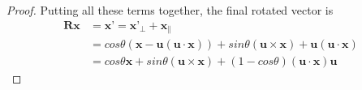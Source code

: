 \documentclass[letterpaper, 11pt]{article}
\begin{document}
\begin{proof}
    Putting all these terms together, the final rotated vector is
    \begin{align}
        \textbf{R}\textbf{x} & = \textbf{x'} = \textbf{x'}_{\perp} + \textbf{x}_{\parallel} \nonumber \\
                             & = cos\theta (\textbf{x} - \textbf{u}(\textbf{u} \cdot \textbf{x})) +
        sin\theta (\textbf{u} \times  \textbf{x}) +
        \textbf{u}(\textbf{u} \cdot \textbf{x})\nonumber                                              \\
                             & = cos\theta\textbf{x} + sin\theta (\textbf{u} \times  \textbf{x}) +
        (1-cos\theta)(\textbf{u} \cdot \textbf{x})\textbf{u}
    \end{align}
\end{proof}
\end{document}
